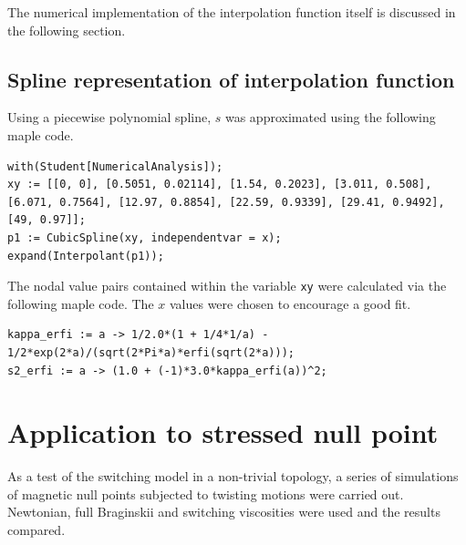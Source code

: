 The numerical implementation of the interpolation function itself is discussed in the following section.

\subsection{Spline representation of interpolation function}

Using a piecewise polynomial spline, $s$ was approximated using the following maple code.
\begin{verbatim}
with(Student[NumericalAnalysis]);
xy := [[0, 0], [0.5051, 0.02114], [1.54, 0.2023], [3.011, 0.508], [6.071, 0.7564], [12.97, 0.8854], [22.59, 0.9339], [29.41, 0.9492], [49, 0.97]];
p1 := CubicSpline(xy, independentvar = x);
expand(Interpolant(p1));
\end{verbatim}
The nodal value pairs contained within the variable \verb|xy| were calculated via the following maple code. The $x$ values were chosen to encourage a good fit.
\begin{verbatim}
kappa_erfi := a -> 1/2.0*(1 + 1/4*1/a) - 1/2*exp(2*a)/(sqrt(2*Pi*a)*erfi(sqrt(2*a)));
s2_erfi := a -> (1.0 + (-1)*3.0*kappa_erfi(a))^2;
\end{verbatim}





\section{Application to stressed null point}

\label{sec:slow_null_point}

As a test of the switching model in a non-trivial topology, a series of simulations of magnetic null points subjected to twisting motions were carried out. Newtonian, full Braginskii and switching viscosities were used and the results compared.

